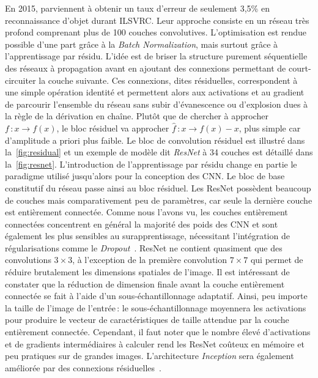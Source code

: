 En 2015, \citet{he_deep_2016} parviennent à obtenir un taux d'erreur de seulement 3,5\% en reconnaissance d'objet durant \gls{ILSVRC}. Leur approche consiste en un réseau très profond comprenant plus de 100 couches convolutives. L'optimisation est rendue possible d'une part grâce à la \emph{Batch Normalization}, mais surtout grâce à l'apprentissage par résidu. L'idée est de briser la structure purement séquentielle des réseaux à propagation avant en ajoutant des connexions permettant de court-circuiter la couche suivante. Ces connexions, dites résiduelles, correspondent à une simple opération identité et permettent alors aux activations et au gradient de parcourir l'ensemble du réseau sans subir d’évanescence ou d'explosion dues à la règle de la dérivation en chaîne. Plutôt que de chercher à approcher $f\,: x \rightarrow f(x)$, le bloc résiduel va approcher $\hat{f}\,: x \rightarrow f(x) - x$, plus simple car d'amplitude a priori plus faible. Le bloc de convolution résiduel est illustré dans la~\cref{fig:residual} et un exemple de modèle dit \emph{\gls{ResNet}} à 34 couches est détaillé dans la~\cref{fig:resnet}. L'introduction de l'apprentissage par résidu change en partie le paradigme utilisé jusqu'alors pour la conception des \gls{CNN}. Le bloc de base constitutif du réseau passe ainsi au bloc résiduel.
Les ResNet possèdent beaucoup de couches mais comparativement peu de paramètres, car seule la dernière couche est entièrement connectée. Comme nous l'avons vu, les couches entièrement connectées concentrent en général la majorité des poids des \gls{CNN} et sont également les plus sensibles au surapprentissage, nécessitant l'intégration de régularisations comme le \emph{Dropout}~\cite{srivastava_dropout_2014}. ResNet ne contient quasiment que des convolutions $3\times3$, à l'exception de la première convolution $7\times7$ qui permet de réduire brutalement les dimensions spatiales de l'image. Il est intéressant de constater que la réduction de dimension finale avant la couche entièrement connectée se fait à l'aide d'un sous-échantillonnage adaptatif. Ainsi, peu importe la taille de l'image de l'entrée\,: le sous-échantillonnage moyennera les activations pour produire le vecteur de caractéristiques de taille attendue par la couche entièrement connectée. Cependant, il faut noter que le nombre élevé d'activations et de gradients intermédiaires à calculer rend les ResNet coûteux en mémoire et peu pratiques sur de grandes images. L'architecture \emph{Inception} sera également améliorée par des connexions résiduelles~\cite{szegedy_inception-v4_2017}.


